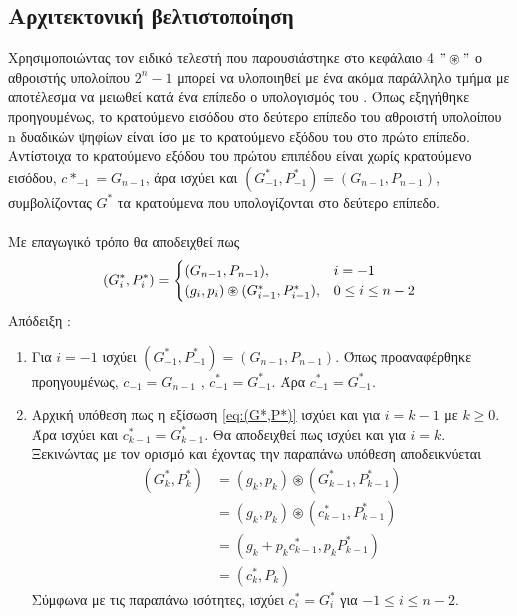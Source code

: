 \subsection{Αρχιτεκτονική βελτιστοποίηση}

Χρησιμοποιώντας τον ειδικό τελεστή που παρουσιάστηκε στο κεφάλαιο 4 $"\circledast"$
ο αθροιστής υπολοίπου $2^n-1$ μπορεί να υλοποιηθεί με ένα ακόμα παράλληλο τμήμα 
με αποτέλεσμα να μειωθεί κατά ένα επίπεδο ο υπολογισμός του \cite{863036}.
Όπως εξηγήθηκε προηγουμένως, το κρατούμενο εισόδου στο δεύτερο επίπεδο του αθροιστή υπολοίπου n
δυαδικών ψηφίων είναι ίσο με το κρατούμενο εξόδου του στο πρώτο επίπεδο. Αντίστοιχα το κρατούμενο εξόδου του πρώτου επιπέδου είναι 
χωρίς κρατούμενο εισόδου, $c*_{-1} = G_{n-1}$, άρα ισχύει και 
$(G^*_{-1},P^*_{-1}) = (G_{n-1},P_{n-1})$, συμβολίζοντας $G^*$ τα κρατούμενα που υπολογίζονται 
στο δεύτερο επίπεδο.\\\\
Με επαγωγικό τρόπο θα αποδειχθεί πως
\begin{equation}
\label{eq:(G*,P*)}
\equationame{Εξίσωση κρατουμένων του $2^n-1$ αθροιστή}
    (G^*_i,P^*_i) =
    \begin{cases}
        (G_{n-1},P_{n-1}) ,& i = -1\\
        (g_i,p_i)\circledast(G^*_{i-1},P^*_{i-1}) ,& 0\leq i \leq n-2
    \end{cases}
\end{equation}
Απόδειξη :
\begin{enumerate}
    \item Για $i=-1$ ισχύει $(G^*_{-1},P^*_{-1}) = (G_{n-1},P_{n-1})$. Όπως προαναφέρθηκε προηγουμένως, $c_{-1} = G_{n-1}$ , $c^*_{-1} = G^*_{-1}$. Άρα $c^*_{-1} = G^*_{-1}$.
    \item Αρχική υπόθεση πως η εξίσωση \ref{eq:(G*,P*)} ισχύει και για $i=k-1$ με $k \geq 0$.
    Άρα ισχύει και $c^*_{k-1} = G^*_{k-1}$. Θα αποδειχθεί πως ισχύει και για $i=k$. Ξεκινώντας 
    με τον ορισμό και έχοντας την παραπάνω υπόθεση αποδεικνύεται 
    \begin{equation*}
    \begin{split}
        (G^*_k,P^*_k) &= (g_k,p_k) \circledast (G^*_{k-1},P^*_{k-1})\\
        &= (g_k,p_k) \circledast (c^*_{k-1},P^*_{k-1})\\
        &= (g_k + p_k c^*_{k-1} , p_k P^*_{k-1})\\
        &= (c^*_{k},P_k)
    \end{split}
    \end{equation*}
    Σύμφωνα με τις παραπάνω ισότητες, ισχύει $c^*_i = G^*_i$ για $-1 \leq i \leq n-2$.
\end{enumerate}

